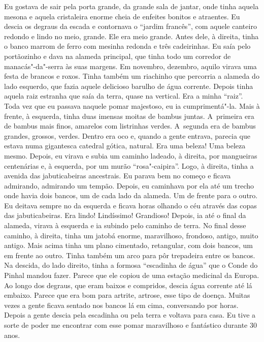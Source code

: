 Eu gostava de sair pela porta grande, da grande sala de jantar, onde
tinha aquela mesona e aquela cristaleira enorme cheia de enfeites
bonitos e atraentes. Eu descia os degraus da escada e contornava o
``jardim francês'', com aquele canteiro redondo e lindo no meio, grande.
Ele era meio grande. Antes dele, à direita, tinha o banco marrom de
ferro com mesinha redonda e três cadeirinhas. Eu saía pelo portãozinho e
dava na alameda principal, que tinha todo um corredor de
manacás"-da"-serra às suas margens. Em novembro, dezembro, aquilo virava
uma festa de brancos e roxos. Tinha também um riachinho que percorria a
alameda do lado esquerdo, que fazia aquele delicioso barulho de água
corrente. Depois tinha aquela raiz estranha que saía da terra, quase na
vertical. Era a minha ``raiz''. Toda vez que eu passava naquele pomar
majestoso, eu ia cumprimentá"-la. Mais à frente, à esquerda, tinha duas
imensas moitas de bambus juntas. A~primeira era de bambus mais finos,
amarelos com listrinhas verdes. A~segunda era de bambus grandes,
grossos, verdes. Dentro era oco e, quando a gente entrava, parecia que
estava numa gigantesca catedral gótica, natural. Era uma beleza! Uma
beleza mesmo. Depois, eu virava e subia um caminho ladeado, à direita,
por mangueiras centenárias e, à esquerda, por um murão ``rosa"-caipira''.
Logo, à direita, tinha a avenida das jabuticabeiras ancestrais. Eu
parava bem no começo e ficava admirando, admirando um tempão. Depois, eu
caminhava por ela até um trecho onde havia dois bancos, um de cada lado
da alameda. Um de frente para o outro. Eu deitava sempre no da esquerda
e ficava horas olhando o céu através das copas das jabuticabeiras. Era
lindo! Lindíssimo! Grandioso! Depois, ia até o final da alameda, virava
à esquerda e ia subindo pelo caminho de terra. No final desse caminho, à
direita, tinha um jatobá enorme, maravilhoso, frondoso, antigo, muito
antigo. Mais acima tinha um plano cimentado, retangular, com dois
bancos, um em frente ao outro. Tinha também um arco para pôr trepadeira
entre os bancos. Na descida, do lado direito, tinha a formosa
``escadinha de água'' que o Conde do Pinhal mandou fazer. Parece que ele
copiou de uma estação medicinal da Europa. Ao longo dos degraus, que
eram baixos e compridos, descia água corrente até lá embaixo. Parece que
era bom para artrite, artrose, esse tipo de doença. Muitas vezes a gente
ficava sentado nos bancos lá em cima, conversando por horas. Depois a
gente descia pela escadinha ou pela terra e voltava para casa. Eu tive a
sorte de poder me encontrar com esse pomar maravilhoso e fantástico
durante 30 anos.

